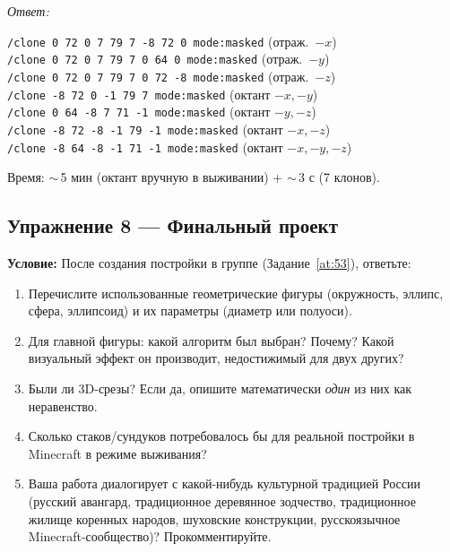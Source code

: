\documentclass[12pt,a4paper]{scrartcl}
\newcommand{\cmd}[1]{\textcolor{earth}{\texttt{\small #1}}}
\begin{document}
\emph{Ответ:}

\begin{minecraft}
\cmd{/clone 0 72 0 7 79 7 -8 72 0 mode:masked} \quad (отраж.\ $-x$)\\
\cmd{/clone 0 72 0 7 79 7 0 64 0 mode:masked} \quad\quad (отраж.\ $-y$)\\
\cmd{/clone 0 72 0 7 79 7 0 72 -8 mode:masked} \quad (отраж.\ $-z$)\\
\cmd{/clone -8 72 0 -1 79 7 mode:masked} \quad\quad\;\; (октант $-x,-y$)\\
\cmd{/clone 0 64 -8 7 71 -1 mode:masked} \quad\quad\;\; (октант $-y,-z$)\\
\cmd{/clone -8 72 -8 -1 79 -1 mode:masked} \quad\;\; (октант $-x,-z$)\\
\cmd{/clone -8 64 -8 -1 71 -1 mode:masked} \quad\;\; (октант $-x,-y,-z$)
\end{minecraft}

Время: $\sim$\,5 мин (октант вручную в выживании) + $\sim$\,3 с (7 клонов).

\subsection*{Упражнение 8 --- Финальный проект}
\textbf{Условие:} После создания постройки в группе (Задание~\ref{at:53}), ответьте:
\begin{enumerate}[label=(\arabic*),leftmargin=1.7em,itemsep=0.15em,topsep=0.2em,nosep]
  \item Перечислите использованные геометрические фигуры (окружность, эллипс, сфера, эллипсоид) и их параметры (диаметр или полуоси).
  \item Для главной фигуры: какой алгоритм был выбран? Почему? Какой визуальный эффект он производит, недостижимый для двух других?
  \item Были ли 3D-срезы? Если да, опишите математически \emph{один} из них как неравенство.
  \item Сколько стаков/сундуков потребовалось бы для реальной постройки в Minecraft в режиме выживания?
  \item Ваша работа диалогирует с какой-нибудь культурной традицией России (русский авангард, традиционное деревянное зодчество, традиционное жилище коренных народов, шуховские конструкции, русскоязычное Minecraft-сообщество)? Прокомментируйте.
\end{enumerate}

\newpage
\end{document}
